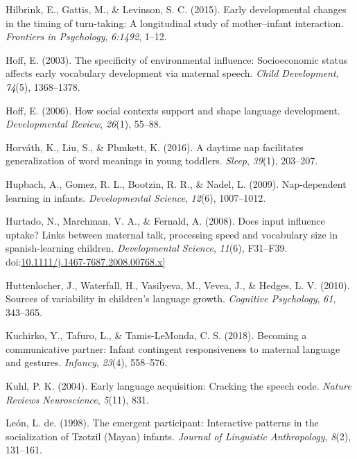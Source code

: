 \documentclass[floatsintext,man]{apa6}
\theoremstyle{definition}
\theoremstyle{definition}
\theoremstyle{definition}
\theoremstyle{remark}
\begin{document}
\hypertarget{ref-hilbrink2015early}{}
Hilbrink, E., Gattis, M., \& Levinson, S. C. (2015). Early developmental
changes in the timing of turn-taking: A longitudinal study of
mother--infant interaction. \emph{Frontiers in Psychology},
\emph{6:1492}, 1--12.

\hypertarget{ref-hoff2003specificity}{}
Hoff, E. (2003). The specificity of environmental influence:
Socioeconomic status affects early vocabulary development via maternal
speech. \emph{Child Development}, \emph{74}(5), 1368--1378.

\hypertarget{ref-hoff2006social}{}
Hoff, E. (2006). How social contexts support and shape language
development. \emph{Developmental Review}, \emph{26}(1), 55--88.

\hypertarget{ref-horvath2016daytime}{}
Horváth, K., Liu, S., \& Plunkett, K. (2016). A daytime nap facilitates
generalization of word meanings in young toddlers. \emph{Sleep},
\emph{39}(1), 203--207.

\hypertarget{ref-hupbach2009nap}{}
Hupbach, A., Gomez, R. L., Bootzin, R. R., \& Nadel, L. (2009).
Nap-dependent learning in infants. \emph{Developmental Science},
\emph{12}(6), 1007--1012.

\hypertarget{ref-hurtado2008does}{}
Hurtado, N., Marchman, V. A., \& Fernald, A. (2008). Does input
influence uptake? Links between maternal talk, processing speed and
vocabulary size in spanish-learning children. \emph{Developmental
Science}, \emph{11}(6), F31--F39.
doi:\href{https://doi.org/10.1111/j.1467-7687.2008.00768.x\%5D}{10.1111/j.1467-7687.2008.00768.x{]}}

\hypertarget{ref-huttenlocher2010sources}{}
Huttenlocher, J., Waterfall, H., Vasilyeva, M., Vevea, J., \& Hedges, L.
V. (2010). Sources of variability in children's language growth.
\emph{Cognitive Psychology}, \emph{61}, 343--365.

\hypertarget{ref-kuchirko2017becoming}{}
Kuchirko, Y., Tafuro, L., \& Tamis-LeMonda, C. S. (2018). Becoming a
communicative partner: Infant contingent responsiveness to maternal
language and gestures. \emph{Infancy}, \emph{23}(4), 558--576.

\hypertarget{ref-kuhl2004early}{}
Kuhl, P. K. (2004). Early language acquisition: Cracking the speech
code. \emph{Nature Reviews Neuroscience}, \emph{5}(11), 831.

\hypertarget{ref-deleon1998emergent}{}
León, L. de. (1998). The emergent participant: Interactive patterns in
the socialization of Tzotzil (Mayan) infants. \emph{Journal of
Linguistic Anthropology}, \emph{8}(2), 131--161.
\end{document}
